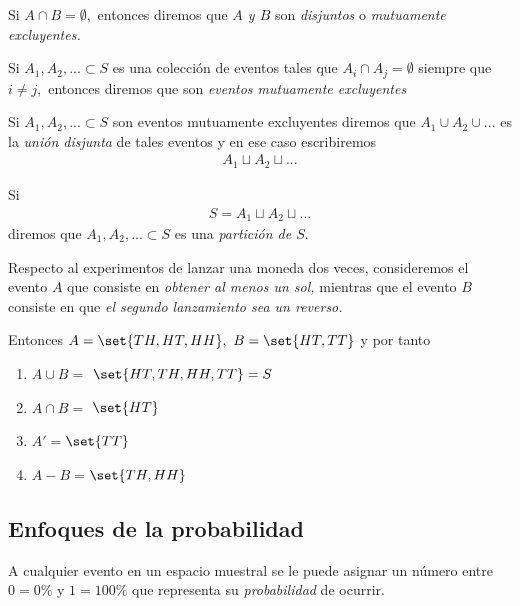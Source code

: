 Si $A\cap B= \emptyset,$ entonces diremos que \emph{$A$ y $B$} son \emph{disjuntos} o \emph{mutuamente excluyentes.} 

\begin{defn}
	Si $A_{1},A_{2},... \subset S$ es una colección de eventos tales que $A_{i}\cap A_{j}=\emptyset$ siempre que $i\neq j,$ entonces diremos que son \emph{eventos mutuamente excluyentes}
\end{defn}

\begin{defn}
	Si $A_{1}, A_{2}, ...\subset S$ son eventos mutuamente excluyentes diremos que $A_{1} \cup A_{2} \cup ... $ es la \emph{unión disjunta} de tales eventos y en ese caso escribiremos
	\begin{align*}
		A_{1}\sqcup A_{2} \sqcup ...
	\end{align*}
\end{defn}


\begin{defn}
	Si \begin{align*}
		S=A_{1}\sqcup A_{2} \sqcup ...
	\end{align*}
	diremos que $A_{1},A_{2},...\subset S$  es una \emph{partición de $S.$}
\end{defn}


\begin{ejemplo}
	\label{exmp:1.9}
	Respecto al experimentos de lanzar una moneda dos veces, consideremos el evento $A$ que consiste en \emph{obtener al menos un sol,}  mientras que el evento $B$ consiste en que \emph{el segundo lanzamiento sea un reverso.}
	
	Entonces $A=\set{TH,HT,HH},$ $B=\set{HT,TT}$ y por tanto 
	\begin{enumerate}
		\item $A\cup B =$ $\set{HT,TH,HH,TT}= S$ 
		\item $A\cap B =$ $\set{HT}$ 
		\item $A'=$$\set{TT}$
		\item $A-B=$$\set{TH,HH}$
	\end{enumerate}
	
\end{ejemplo}


\subsection{Enfoques de la probabilidad}

A cualquier evento en un espacio muestral se le puede asignar un número entre $0=0\%$ y $1=100\%$ que representa su \emph{probabilidad} de ocurrir.


